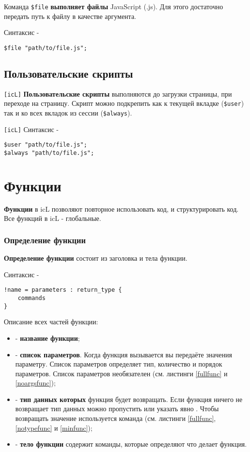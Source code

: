 \documentclass[a4paper, 14pt]{extarticle}
\newenvironment{icItems}
	{ \begin{itemize} [noitemsep,nolistsep] }
	{ \end{itemize} }
\begin{document}
Команда \lstinline|$file| {\bf выполняет файлы} JavaScript (.js). Для этого достаточно передать путь к файлу в качестве аргумента.

Синтаксис -
\begin{lstlisting}[numbers=none]
$file "path/to/file.js";
\end{lstlisting}

\subsection{Пользовательские скрипты}

\lstinline|[icL]| {\bf Пользовательские скрипты} выполняются до загрузки страницы, при переходе на страницу. Скрипт можно подкрепить как к текущей вкладке (\lstinline|$user|) так и ко всех вкладок из сессии (\lstinline|$always|).

\lstinline|[icL]| Синтаксис -
\begin{lstlisting}[numbers=none]
$user "path/to/file.js";
$always "path/to/file.js";
\end{lstlisting}

\newpage
\section{Функции}

{\bf Функции} в icL позволяют повторное использовать код, и структурировать код. Все функций в icL - глобальные.

\subsubsection{Определение функции}

{\bf Определение функции} состоит из заголовка и тела функции.

\noindent Синтаксис -
\begin{lstlisting}[numbers=none]
!name = parameters : return_type {
	commands
}
\end{lstlisting}

Описание всех частей функции:
\begin{icItems}
\item
	 - {\bf название функции};
\item
	 - {\bf список параметров}. Когда функция вызывается вы передаёте значения параметру. Список параметров определяет тип, количество и порядок параметров. Список параметров необязателен (см. листинги \ref{fullfunc} и \ref{noargsfunc});
\item
	 - {\bf тип данных которых} функция будет возвращать. Если функция ничего не возвращает тип данных можно пропустить или указать явно \void{}. Чтобы возвращать значение используется команда  (см. листинги \ref{fullfunc}, \ref{notypefunc} и \ref{minfunc});
\item
	 - {\bf тело функции} содержит команды, которые определяют что делает функция.
\end{icItems}
\end{document}

